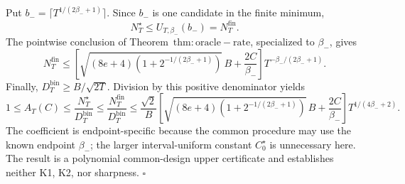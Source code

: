 Put \(b_-=\lceil T^{1/(2\beta_-+1)}\rceil\). Since \(b_-\) is one candidate in the finite minimum,
\[
N_T^\star\le U_{T,\beta_-}(b_-)=N_T^{\mathrm{fin}}.
\]
The pointwise conclusion of Theorem~\(\mathrm{thm:oracle-rate}\), specialized to \(\beta_-\), gives
\[
N_T^{\mathrm{fin}}
\le
\left[\sqrt{(8e+4)\left(1+2^{-1/(2\beta_-+1)}\right)}\,B+\frac{2C}{\beta_-}\right]
T^{-\beta_-/(2\beta_-+1)}.
\]
Finally, \(D_T^{\mathrm{bin}}\ge B/\sqrt{2T}\). Division by this positive denominator yields
\[
1\le A_T(C)
\le\frac{N_T^\star}{D_T^{\mathrm{bin}}}
\le\frac{N_T^{\mathrm{fin}}}{D_T^{\mathrm{bin}}}
\le\frac{\sqrt2}{B}
\left[\sqrt{(8e+4)\left(1+2^{-1/(2\beta_-+1)}\right)}\,B+\frac{2C}{\beta_-}\right]
T^{1/(4\beta_-+2)}.
\]
The coefficient is endpoint-specific because the common procedure may use the known endpoint \(\beta_-\); the larger interval-uniform constant \(C_0^\star\) is unnecessary here. The result is a polynomial common-design upper certificate and establishes neither K1, K2, nor sharpness. \(\square\)
